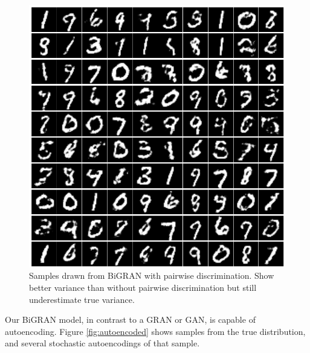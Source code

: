 \documentclass{article}
\begin{document}
\begin{figure}[h]
\caption{Samples drawn from BiGRAN with pairwise discrimination. Show better variance than without pairwise discrimination but still underestimate true variance.}
\label{fig:generated}
\includegraphics[scale=0.3]{images/generated.png}
\centering
\end{figure}

Our BiGRAN model, in contrast to a GRAN or GAN, is capable of autoencoding. Figure \ref{fig:autoencoded} shows samples from the true distribution, and several stochastic autoencodings of that sample.
 
\end{document}
